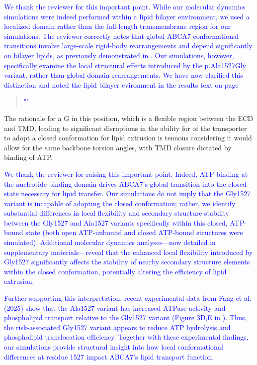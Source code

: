 {\textcolor{blue}{We thank the reviewer for this important point. While our molecular dynamics simulations were indeed performed within a lipid bilayer environment, we used a localized domain rather than the full-length transmembrane region for our simulations. The reviewer correctly notes that global ABCA7 conformational transitions involve large-scale rigid-body rearrangements and depend significantly on bilayer lipids, as previously demonstrated in \cite{Le2023-on}. Our simulations, however, specifically examine the local structural effects introduced by the p.Ala1527Gly variant, rather than global domain rearrangements. We have now clarified this distinction and noted the lipid bilayer evironment in the results text on page~\pageref{quoteP-label}}

\begin{quote}
	\textcolor{blue}{"}\quoteP\textcolor{blue}{"}\\
\end{quote}

The rationale for a G in this position, which is a flexible region between the ECD and TMD, leading to significant disruptions in the ability for of the transporter to adopt a closed conformation for lipid extrusion is tenuous considering it would allow for the same backbone torsion angles, with TMD closure dictated by binding of ATP. 

\textcolor{blue}{We thank the reviewer for raising this important point. Indeed, ATP binding at the nucleotide-binding domain drives ABCA7’s global transition into the closed state necessary for lipid transfer. Our simulations do not imply that the Gly1527 variant is incapable of adopting the closed conformation; rather, we identify substantial differences in local flexibility and secondary structure stability between the Gly1527 and Ala1527 variants specifically within this closed, ATP-bound state (both open ATP-unbound and closed ATP-bound structures were simulated). Additional molecular dynamics analyses—now detailed in supplementary materials—reveal that the enhanced local flexibility introduced by Gly1527 significantly affects the stability of nearby secondary structure elements within the closed conformation, potentially altering the efficiency of lipid extrusion.}

\textcolor{blue}{Further supporting this interpretation, recent experimental data from Fang et al. (2025) \cite{Fang2025} show that the Ala1527 variant has increased ATPase activity and phospholipid transport relative to the Gly1527 variant (Figure 3D,E in \cite{Fang2025}). Thus, the risk-associated Gly1527 variant appears to reduce ATP hydrolysis and phospholipid translocation efficiency. Together with these experimental findings, our simulations provide structural insight into how local conformational differences at residue 1527 impact ABCA7’s lipid transport function.}

}
